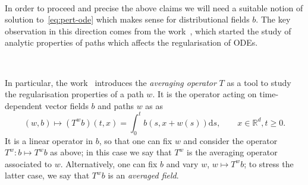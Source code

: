 \documentclass[10pt]{article}
\newcommand{\mathd}{\mathrm{d}}
\newcommand{\tmtextit}[1]{{\itshape{#1}}}
\begin{document}
\

In order to proceed and precise the above claims we will need a suitable
notion of solution to~{\eqref{eq:pert-ode}} which makes sense for
distributional fields $b$. The key observation in this direction comes from
the work~{\cite{catelliergubinelli}}, which started the study of analytic
properties of paths which affects the regularisation of ODEs.

\

In particular, the work~{\cite{catelliergubinelli}} introduces the
\tmtextit{averaging operator} $T$ as a tool to study the regularisation
properties of a path $w$. It is the operator acting on time-dependent vector
fields $b$ and paths $w$ as as
\[ (w, b) \mapsto (T^w b) (t, x) = \int_0^t b (s, x + w (s)) \mathd s, \qquad
   x \in \mathbb{R}^d, t \geqslant 0. \]
It is a linear operator in $b$, so that one can fix $w$ and consider the
operator $T^w : b \mapsto T^w b$ as above; in this case we say that $T^w$ is
the averaging operator associated to $w$. Alternatively, one can fix $b$ and
vary $w$, $w \mapsto T^w b$; to stress the latter case, we say that $T^w b$ is
an \tmtextit{averaged field}.

\
\end{document}
